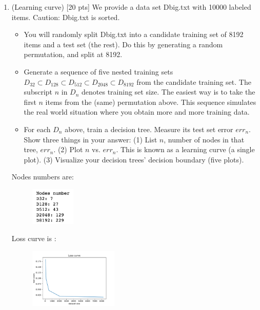 \documentclass[a4paper]{article}
\theoremstyle{definition}
\newenvironment{soln}{
    \leavevmode\color{blue}\ignorespaces
}{}
\begin{document}
\begin{enumerate}
\item (Learning curve)  [20 pts] We provide a data set Dbig.txt with 10000 labeled items.  Caution: Dbig.txt is sorted.
  \begin{itemize}
  \item You will randomly split Dbig.txt into a candidate training set of 8192 items and a test set (the rest).  Do this by generating a random permutation, and split at 8192.
  \item Generate a sequence of five nested training sets $D_{32} \subset D_{128} \subset D_{512} \subset D_{2048} \subset D_{8192}$ from the candidate training set.  The subscript $n$ in $D_n$ denotes training set size.  The easiest way is to take the first $n$ items from the (same) permutation above.  This sequence simulates the real world situation where you obtain more and more training data.
  \item For each $D_n$ above, train a decision tree.  Measure its test set error $err_n$.  Show three things in your answer: (1) List $n$, number of nodes in that tree, $err_n$. (2) Plot $n$ vs. $err_n$.  This is known as a learning curve (a single plot). (3) Visualize your decision trees' decision boundary (five plots).
  \end{itemize}

\begin{soln} 
Nodes numbers are:
	    \begin{figure}[H]
	        \centering
	        \includegraphics[width=0.2\textwidth]{Nodes.pdf}
	        \captionsetup{labelformat=empty}
	        \caption{}
	        \label{fig:my_label}
	    \end{figure}

Loss curve is :
	    \begin{figure}[H]
	        \centering
	        \includegraphics[width=0.4\textwidth]{loss_curve.pdf}
	        \captionsetup{labelformat=empty}
	        \caption{}
	        \label{fig:my_label}
	    \end{figure}


\end{soln}
\end{enumerate}
\end{document}
